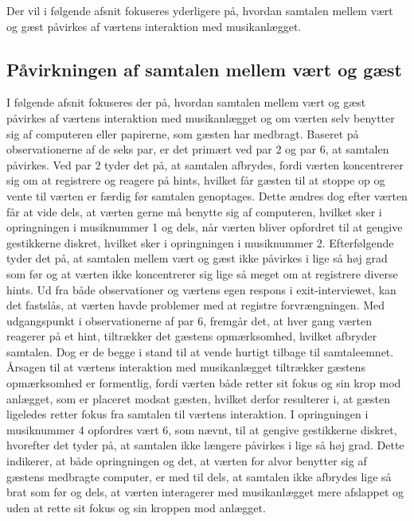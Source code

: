 Der vil i følgende afsnit fokuseres yderligere på, hvordan samtalen mellem vært og gæst påvirkes af værtens interaktion med musikanlægget.
%
\subsection{Påvirkningen af samtalen mellem vært og gæst}
\label{TestresultaterSocialAcceptSamtale}
%
I følgende afsnit fokuseres der på, hvordan samtalen mellem vært og gæst påvirkes af værtens interaktion med musikanlægget og om værten selv benytter sig af computeren eller papirerne, som gæsten har medbragt. \blankline
%
Baseret på observationerne af de seks par, er det primært ved par 2 og par 6, at samtalen påvirkes. Ved par 2 tyder det på, at samtalen afbrydes, fordi værten koncentrerer sig om at registrere og reagere på hints, hvilket får gæsten til at stoppe op og vente til værten er færdig før samtalen genoptages. Dette ændres dog efter værten får at vide dels, at værten gerne må benytte sig af computeren, hvilket sker i opringningen i musiknummer 1 og dels, når værten bliver opfordret til at gengive gestikkerne diskret, hvilket sker i opringningen i musiknummer 2. Efterfølgende tyder det på, at samtalen mellem vært og gæst ikke påvirkes i lige så høj grad som før og at værten ikke koncentrerer sig lige så meget om at registrere diverse hints. Ud fra både observationer og værtens egen respons i exit-interviewet, kan det fastslås, at værten havde problemer med at registre forvrængningen. Med udgangspunkt i observationerne af par 6, fremgår det, at hver gang værten reagerer på et hint, tiltrækker det gæstens opmærksomhed, hvilket afbryder samtalen. Dog er de begge i stand til at vende hurtigt tilbage til samtaleemnet. Årsagen til at værtens interaktion med musikanlægget tiltrækker gæstens opmærksomhed er formentlig, fordi værten både retter sit fokus og sin krop mod anlægget, som er placeret modsat gæsten, hvilket derfor resulterer i, at gæsten ligeledes retter fokus fra samtalen til værtens interaktion. I opringningen i musiknummer 4 opfordres vært 6, som nævnt, til at gengive gestikkerne diskret, hvorefter det tyder på, at samtalen ikke længere påvirkes i lige så høj grad. Dette indikerer, at både opringningen og det, at værten for alvor benytter sig af gæstens medbragte computer, er med til dels, at samtalen ikke afbrydes lige så brat som før og dels, at værten interagerer med musikanlægget mere afslappet og uden at rette sit fokus og sin kroppen mod anlægget.

